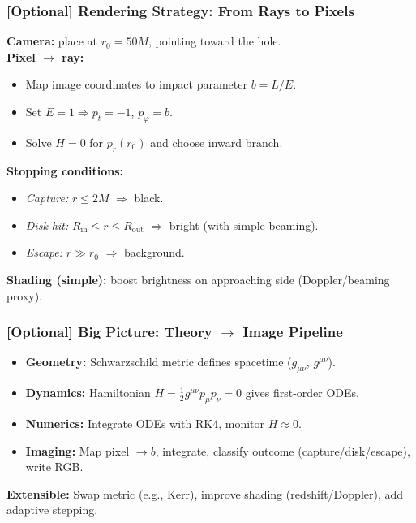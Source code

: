 \documentclass[aspectratio=169]{beamer}
\newcommand{\ProgressStep}[1]{\progressstep{#1}}
\newcommand{\ThisFrameTitle}[1]{\frametitle{#1}}
\begin{document}
\begin{frame}
  \ProgressStep{-1}\ThisFrameTitle{[Optional] Rendering Strategy: From Rays to Pixels}
  \textbf{Camera:} place at \(r_0=50M\), pointing toward the hole.\\[0.4em]
  \textbf{Pixel $\rightarrow$ ray:}
  \begin{itemize}
    \item Map image coordinates to impact parameter \(b=L/E\).
    \item Set \(E=1\Rightarrow p_t=-1\), \(p_\varphi=b\).
    \item Solve \(H=0\) for \(p_r(r_0)\) and choose inward branch.
  \end{itemize}
  \textbf{Stopping conditions:}
  \begin{itemize}
    \item \emph{Capture:} \(r \le 2M\) \(\Rightarrow\) black.
    \item \emph{Disk hit:} \(R_{\text{in}} \le r \le R_{\text{out}}\) \(\Rightarrow\) bright (with simple beaming).
    \item \emph{Escape:} \(r \gg r_0\) \(\Rightarrow\) background.
  \end{itemize}
  \textbf{Shading (simple):} boost brightness on approaching side (Doppler/beaming proxy).
\end{frame}

\begin{frame}
  \ProgressStep{-1}\ThisFrameTitle{[Optional] Big Picture: Theory $\rightarrow$ Image Pipeline}
  \begin{itemize}
    \item \textbf{Geometry:} Schwarzschild metric defines spacetime (\(g_{\mu\nu}\), \(g^{\mu\nu}\)).
    \item \textbf{Dynamics:} Hamiltonian \(H=\tfrac12 g^{\mu\nu}p_\mu p_\nu=0\) gives first-order ODEs.
    \item \textbf{Numerics:} Integrate ODEs with RK4, monitor \(H\approx 0\).
    \item \textbf{Imaging:} Map pixel \(\to b\), integrate, classify outcome (capture/disk/escape), write RGB.
  \end{itemize}
  \vspace{0.4em}
  \textbf{Extensible:} Swap metric (e.g., Kerr), improve shading (redshift/Doppler), add adaptive stepping.
\end{frame}

\end{document}
